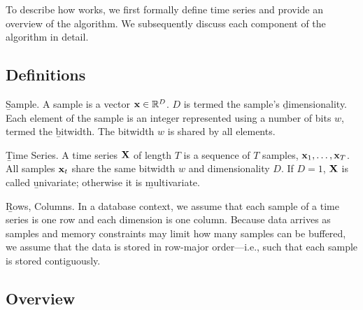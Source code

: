 

To describe how \minesp works, we first formally define time series and provide an overview of the algorithm. We subsequently discuss each component of the algorithm in detail.

\vspace{2mm}
\subsection{Definitions}
\vspace{-2mm}
\begin{Definition} \b{Sample.} A sample is a vector $\mathbf{x} \in \mathbb{R}^D$. $D$ is termed the sample's \b{dimensionality}. Each element of the sample is an integer represented using a number of bits $w$, termed the \b{bitwidth}. The bitwidth $w$ is shared by all elements.
\end{Definition}
\vspace{-5mm}
\begin{Definition} \b{Time Series.} A time series $\mathbf{X}$ of length $T$ is a sequence of $T$ samples, $\mathbf{x}_1,\ldots,\mathbf{x}_T$. All samples $\mathbf{x}_t$ share the same bitwidth $w$ and dimensionality $D$. If $D = 1$, $\mathbf{X}$ is called \b{univariate}; otherwise it is \b{multivariate}.
\end{Definition}
\vspace{-5mm}
\begin{Definition} \b{Rows, Columns.} In a database context, we assume that each sample of a time series is one row and each dimension is one column. Because data arrives as samples and memory constraints may limit how many samples can be buffered, we assume that the data is stored in row-major order---i.e., such that each sample is stored contiguously.
\end{Definition}

\subsection{Overview}

